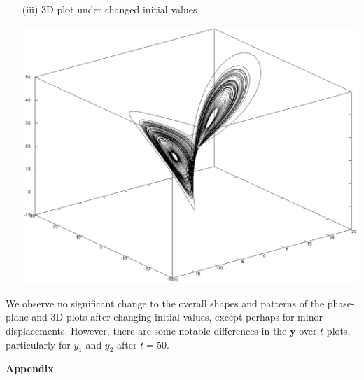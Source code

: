 \documentclass[11pt,a4paper]{article}
\begin{document}
\begin{enumerate}
\begin{enumerate}
	\pagebreak
	
	\item[(iii)] 3D plot under changed initial values
		\begin{center}
		\includegraphics[width=1\textwidth]{threeds.eps}
	\end{center}
	\end{enumerate}
	
	We observe no significant change to the overall shapes and patterns of the phase-plane and 3D plots after changing initial values, except perhaps for minor displacements. However, there are some notable differences in the $\mathbf{y}$ over $t$ plots, particularly for $y_1$ and $y_2$ after $t=50$.
\end{enumerate}

\pagebreak

\textbf{Appendix}
\end{document}
